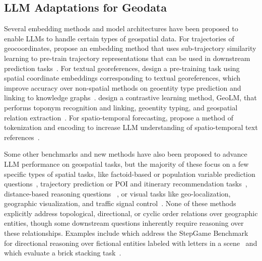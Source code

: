 \subsection{LLM Adaptations for Geodata}
Several embedding methods and model architectures have been proposed to enable LLMs to handle certain types of geospatial data.
For trajectories of geocoordinates, \citeauthor{Hu2023} propose an embedding method that uses sub-trajectory similarity learning to pre-train trajectory representations that can be used in downstream prediction tasks~\cite{Hu2023}.
For textual georeferences, \citeauthor{Li2021} design a pre-training task using spatial coordinate embeddings %
corresponding to textual georeferences, which improve
accuracy over non-spatial methods on geoentity type prediction and linking to knowledge graphs~\cite{Li2021}.
\citeauthor{Li2023b} design a contrastive learning method, GeoLM, that performs toponym recognition and linking, geoentity typing, and geospatial relation extraction~\cite{Li2023b}.
For spatio-temporal forecasting, \citeauthor{Liu2024large} propose a method of tokenization and encoding to increase LLM understanding of spatio-temporal text references~\cite{Liu2024large}.

Some other benchmarks and new methods have also been proposed to advance LLM performance on geospatial tasks, but the majority of these focus on a few specific types of spatial tasks, like
factoid-based or population variable prediction questions~\cite{Qi2023,Roberts2023,Gupta2024,Yan2024,Manvi2024,Lietard2021}, 
trajectory prediction or POI and itinerary recommendation tasks~\cite{Schneider2025,Yu2025,Roberts2023,Xie2024,Gundawar2024,De2024,Sharma2023}, 
distance-based reasoning questions~\cite{Bhandari2023,Osullivan2024} , 
or visual tasks like geo-localization, geographic visualization, and traffic signal control~\cite{Feng2024b,Chen2024}.
None of these methods explicitly address topological, directional, or cyclic order relations over geographic entities, though some downstream questions inherently require reasoning over these relationships.
Examples include \citeauthor{Li2024} which address the StepGame Benchmark for directional reasoning over fictional entities labeled with letters in a scene~\cite{Li2024} and \citeauthor{Majic2024} which evaluate a brick stacking task~\cite{Majic2024}.

